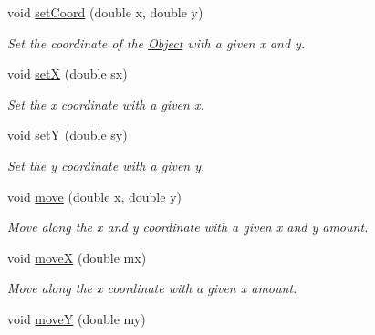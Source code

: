 \begin{DoxyCompactItemize}
\mbox{\label{classObject_a2095a5a402443ff9602f699dc76c2762}} 
void \hyperlink{classObject_a2095a5a402443ff9602f699dc76c2762}{set\+Coord} (double x, double y)
\begin{DoxyCompactList}\small\item\em Set the coordinate of the \hyperlink{classObject}{Object} with a given x and y. \end{DoxyCompactList}\item 
\mbox{\label{classObject_a3a3e2b361faf2deb8663ecda9c6c4868}} 
void \hyperlink{classObject_a3a3e2b361faf2deb8663ecda9c6c4868}{setX} (double sx)
\begin{DoxyCompactList}\small\item\em Set the x coordinate with a given x. \end{DoxyCompactList}\item 
\mbox{\label{classObject_acab13582a9cb12392fc7a83d1d80e3d6}} 
void \hyperlink{classObject_acab13582a9cb12392fc7a83d1d80e3d6}{setY} (double sy)
\begin{DoxyCompactList}\small\item\em Set the y coordinate with a given y. \end{DoxyCompactList}\item 
\mbox{\label{classObject_af4133db64f4051294dc103a2f3553a6a}} 
void \hyperlink{classObject_af4133db64f4051294dc103a2f3553a6a}{move} (double x, double y)
\begin{DoxyCompactList}\small\item\em Move along the x and y coordinate with a given x and y amount. \end{DoxyCompactList}\item 
\mbox{\label{classObject_a43f3220cb27a282c28afaea57ac9a098}} 
void \hyperlink{classObject_a43f3220cb27a282c28afaea57ac9a098}{moveX} (double mx)
\begin{DoxyCompactList}\small\item\em Move along the x coordinate with a given x amount. \end{DoxyCompactList}\item 
\mbox{\label{classObject_a58bab6e78efd8282996d742530c98034}} 
void \hyperlink{classObject_a58bab6e78efd8282996d742530c98034}{moveY} (double my)

\end{DoxyCompactItemize}
